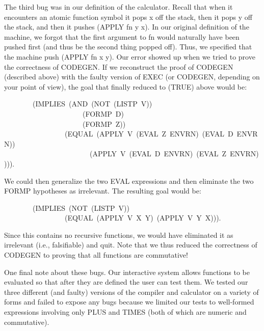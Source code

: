 \documentclass[10pt]{book}
\newenvironment{pubasis}{\begin{flushleft}}{\end{flushleft}}
\begin{document}
The third bug was in our definition of the calculator.  Recall that when
it encounters an atomic function symbol it pops x off the stack, then
it pops y off the stack, and then it pushes (APPLY fn y x).  In our
original definition of the machine, we forgot that the first argument
to fn would naturally have been pushed first (and thus be the second
thing popped off).  Thus, we specified that the machine push (APPLY fn x y).
Our error showed up when we tried to prove the correctness of CODEGEN.
If we reconstruct the proof of CODEGEN (described above) with the
faulty version of EXEC (or CODEGEN, depending on your point of view),
the goal that finally reduced to (TRUE) above would be:
\begin{pubasis}
~~~~~~~~(IMPLIES~(AND~(NOT~(LISTP~V))\\
~~~~~~~~~~~~~~~~~~~~~~(FORMP~D)\\
~~~~~~~~~~~~~~~~~~~~~~(FORMP~Z))\\
~~~~~~~~~~~~~~~~~(EQUAL~(APPLY~V~(EVAL~Z~ENVRN)~(EVAL~D~ENVRN))\\
~~~~~~~~~~~~~~~~~~~~~~~~(APPLY~V~(EVAL~D~ENVRN)~(EVAL~Z~ENVRN)))).\\
\end{pubasis}
We could then generalize the two EVAL expressions and then eliminate
the two FORMP hypotheses as irrelevant.  The resulting goal would
be:
\begin{pubasis}
~~~~~~~~(IMPLIES~(NOT~(LISTP~V))\\
~~~~~~~~~~~~~~~~~(EQUAL~(APPLY~V~X~Y)~(APPLY~V~Y~X))).\\
\end{pubasis}
Since this contains no recursive functions, we would have eliminated it
as irrelevant (i.e., falsifiable) and quit.  Note that we thus reduced
the correctness of CODEGEN to proving that all functions are
commutative!

One final note about these bugs.  Our interactive system allows
functions to be evaluated so that after they are defined the user
can test them.  We tested our three different (and faulty)
versions of the compiler and calculator on a variety of forms
and failed to expose any bugs because we limited our tests to
well-formed expressions involving only PLUS and TIMES (both of which
are numeric and commutative).
\end{document}

